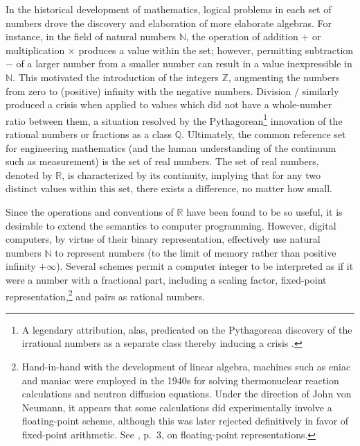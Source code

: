 \documentclass[twoside]{article}
\begin{document}
In the historical development of mathematics, logical problems in each set of numbers drove the discovery and elaboration of more elaborate algebras.  For instance, in the field of natural numbers $\mathbb{N}$, the operation of addition $+$ or multiplication $\times$ produces a value within the set; however, permitting subtraction $-$ of a larger number from a smaller number can result in a value inexpressible in $\mathbb{N}$.  This motivated the introduction of the integers $\mathbb{Z}$, augmenting the numbers from zero to (positive) infinity with the negative numbers.  Division $/$ similarly produced a crisis when applied to values which did not have a whole-number ratio between them, a situation resolved by the Pythagorean\footnote{A legendary attribution, alas, predicated on the Pythagorean discovery of the irrational numbers as a separate class thereby inducing a crisis \citep{SEPPythagoras}.} innovation of the rational numbers or fractions as a class $\mathbb{Q}$.  Ultimately, the common reference set for engineering mathematics (and the human understanding of the continuum such as measurement) is the set of real numbers.  The set of real numbers, denoted by $\mathbb{R}$, is characterized by its continuity, implying that for any two distinct values within this set, there exists a difference, no matter how small.

\sloppy
Since the operations and conventions of $\mathbb{R}$ have been found to be so useful, it is desirable to extend the semantics to computer programming.  However, digital computers, by virtue of their binary representation, effectively use natural numbers $\mathbb{N}$ to represent numbers (to the limit of memory rather than positive infinity $+\infty$).  Several schemes permit a computer integer to be interpreted as if it were a number with a fractional part, including a scaling factor, fixed-point representation,\footnote{Hand-in-hand with the development of linear algebra, machines such as {\sc eniac} and {\sc maniac} were employed in the 1940s for solving thermonuclear reaction calculations and neutron diffusion equations.  Under the direction of John von Neumann, it appears that some calculations did experimentally involve a floating-point scheme, although this was later rejected definitively in favor of fixed-point arithmetic.  See \citet{Kahan1997a}, p.~3, on floating-point representations.} and pairs as rational numbers.
\end{document}
